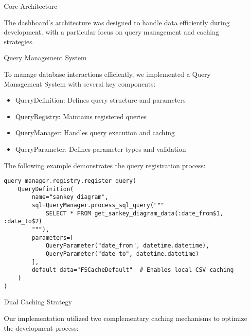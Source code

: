 \begin{section}{Core Architecture}
	\label{sec:implementation-core-architecture}

	The dashboard's architecture was designed to handle data efficiently during development, with a particular focus on query management and caching strategies.

	\begin{subsection}{Query Management System}
		\label{subsec:implementation-core-architecture-query-management}

		To manage database interactions efficiently, we implemented a Query Management System with several key components:

		\begin{itemize}
			\item QueryDefinition: Defines query structure and parameters
			\item QueryRegistry: Maintains registered queries
			\item QueryManager: Handles query execution and caching
			\item QueryParameter: Defines parameter types and validation
		\end{itemize}

		The following example demonstrates the query registration process:

		\begin{listing}[H]
			\caption{Query Management Example}
			\begin{verbatim}
query_manager.registry.register_query(
    QueryDefinition(
        name="sankey_diagram",
        sql=QueryManager.process_sql_query("""
            SELECT * FROM get_sankey_diagram_data(:date_from$1, :date_to$2)
        """),
        parameters=[
            QueryParameter("date_from", datetime.datetime),
            QueryParameter("date_to", datetime.datetime)
        ],
        default_data="FSCacheDefault"  # Enables local CSV caching
    )
)
			\end{verbatim}
			\label{listing:dashboard-implementation-query-management}
		\end{listing}

	\end{subsection}

	\begin{subsection}{Dual Caching Strategy}
		\label{subsec:implementation-core-architecture-caching}

		Our implementation utilized two complementary caching mechanisms to optimize the development process:


\end{subsection}
\end{section}
